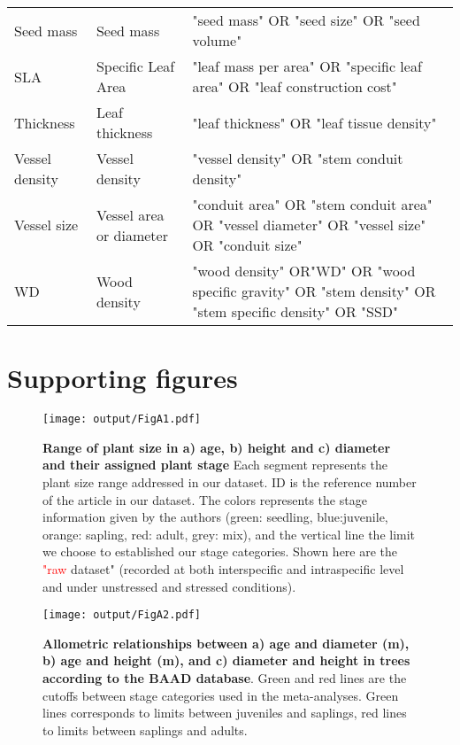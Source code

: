 \documentclass[a4paper]{article}\usepackage[]{graphicx}\usepackage[]{color}
\begin{document}
\begin{appendices}
\begin{table}[ht]
\begin{tabular}{p{3cm}p{3cm}p{8cm}}
  Seed mass & Seed mass & "seed mass" OR "seed size" OR "seed volume" \\
  SLA & Specific Leaf Area & "leaf mass per area" OR "specific leaf area" OR "leaf construction cost" \\
  Thickness & Leaf thickness & "leaf thickness"  OR "leaf tissue density" \\
  Vessel density & Vessel density & "vessel density" OR "stem conduit density" \\
  Vessel size & Vessel area or diameter & "conduit area" OR "stem conduit area" OR "vessel diameter" OR "vessel size" OR "conduit size"   \\
  WD & Wood density & "wood density" OR"WD" OR "wood specific gravity" OR "stem density" OR "stem specific density" OR "SSD" \\
   \hline
\end{tabular}
\end{table}


\newpage
\section{Supporting figures}\label{app:supp_info_figures}

\begin{figure}[htbp]
\centering
\texttt{[image: output/FigA1.pdf]}
\caption{\textbf{Range of plant size in \textbf{a)} age, \textbf{b)} height and \textbf{c)} diameter and their assigned plant stage} Each segment represents the plant size range addressed in our dataset. ID is the reference number of the article in our dataset. The colors represents the stage information given by the authors (green: seedling, blue:juvenile, orange: sapling, red: adult, grey: mix), and the vertical line the limit we choose to established our stage categories. Shown here are the \textcolor{red}{"raw} dataset" (recorded at both interspecific and intraspecific level and under unstressed and stressed conditions). }
\label{FigA1}
\end{figure}


\begin{figure}[htbp]
\centering
\texttt{[image: output/FigA2.pdf]}
\caption{\textbf{Allometric relationships between a) age and diameter (m), b) age and height (m), and c) diameter and height in trees according to the BAAD database}. Green and red lines are the cutoffs between stage categories used in the meta-analyses. Green lines corresponds to limits between juveniles and saplings, red lines to limits between saplings and adults.}
\label{FigA2}
\end{figure}



\end{appendices}
\end{document}

